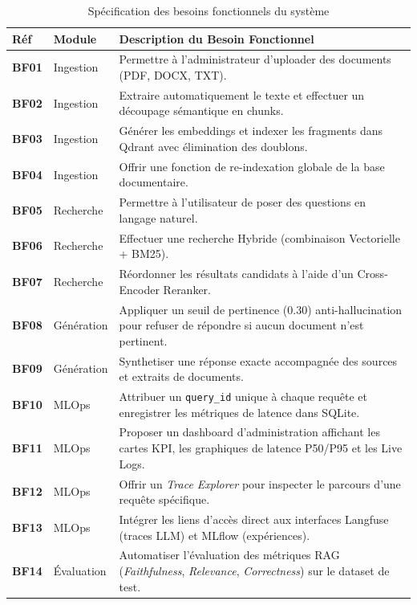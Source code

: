 \begin{table}[htbp]
\centering
\caption{Spécification des besoins fonctionnels du système}
\label{tab:besoins_fonctionnels}
\small
\begin{tabular}{|p{1.5cm}|p{2.5cm}|p{9.5cm}|}
\hline
\textbf{Réf} & \textbf{Module} & \textbf{Description du Besoin Fonctionnel} \\ \hline
\textbf{BF01} & Ingestion & Permettre à l'administrateur d'uploader des documents (PDF, DOCX, TXT). \\ \hline
\textbf{BF02} & Ingestion & Extraire automatiquement le texte et effectuer un découpage sémantique en chunks. \\ \hline
\textbf{BF03} & Ingestion & Générer les embeddings et indexer les fragments dans Qdrant avec élimination des doublons. \\ \hline
\textbf{BF04} & Ingestion & Offrir une fonction de re-indexation globale de la base documentaire. \\ \hline
\textbf{BF05} & Recherche & Permettre à l'utilisateur de poser des questions en langage naturel. \\ \hline
\textbf{BF06} & Recherche & Effectuer une recherche Hybride (combinaison Vectorielle + BM25). \\ \hline
\textbf{BF07} & Recherche & Réordonner les résultats candidats à l'aide d'un Cross-Encoder Reranker. \\ \hline
\textbf{BF08} & Génération & Appliquer un seuil de pertinence ($0.30$) anti-hallucination pour refuser de répondre si aucun document n'est pertinent. \\ \hline
\textbf{BF09} & Génération & Synthetiser une réponse exacte accompagnée des sources et extraits de documents. \\ \hline
\textbf{BF10} & MLOps & Attribuer un \texttt{query\_id} unique à chaque requête et enregistrer les métriques de latence dans SQLite. \\ \hline
\textbf{BF11} & MLOps & Proposer un dashboard d'administration affichant les cartes KPI, les graphiques de latence P50/P95 et les Live Logs. \\ \hline
\textbf{BF12} & MLOps & Offrir un \textit{Trace Explorer} pour inspecter le parcours d'une requête spécifique. \\ \hline
\textbf{BF13} & MLOps & Intégrer les liens d'accès direct aux interfaces Langfuse (traces LLM) et MLflow (expériences). \\ \hline
\textbf{BF14} & Évaluation & Automatiser l'évaluation des métriques RAG (\textit{Faithfulness}, \textit{Relevance}, \textit{Correctness}) sur le dataset de test. \\ \hline
\end{tabular}
\end{table}

